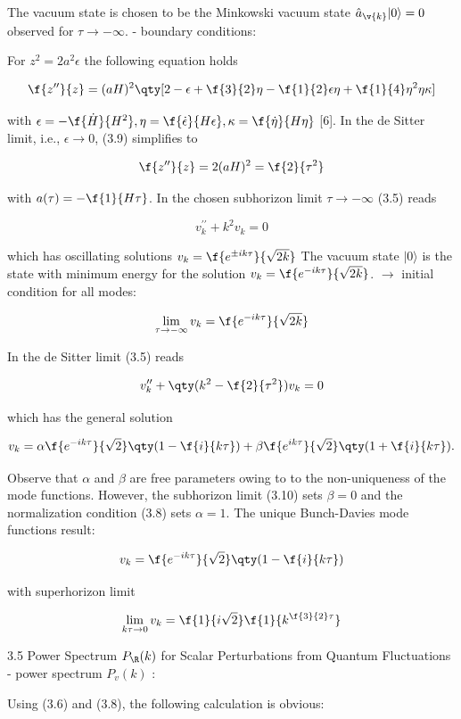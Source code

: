 The vacuum state is chosen to be the Minkowski vacuum state $\hat{a}_{\v{k}}|0\rangle=0$ observed for $\tau \rightarrow-\infty$.
- boundary conditions:

For $z^2=2 a^2 \epsilon$ the following equation holds

\[
\f{z^{\prime \prime}}{z}=(a H)^2\qty[2-\epsilon+\f{3}{2} \eta-\f{1}{2} \epsilon \eta+\f{1}{4} \eta^2 \eta \kappa]
\]

with $\epsilon=-\f{\dot{H}}{H^2}, \eta=\f{\dot{\epsilon}}{H \epsilon}, \kappa=\f{\dot{\eta}}{H \eta}$ [6].
In the de Sitter limit, i.e., $\epsilon \rightarrow 0$, (3.9) simplifies to

\[
\f{z^{\prime \prime}}{z}=2(a H)^2=\f{2}{\tau^2}
\]

with $a(\tau)=-\f{1}{H \tau}$.
In the chosen subhorizon limit $\tau \rightarrow-\infty$ (3.5) reads

\[
v_k^{\prime \prime}+k^2 v_k=0
\]

which has oscillating solutions $v_k=\f{e^{ \pm i k \tau}}{\sqrt{2 k}}$ The vacuum state $|0\rangle$ is the state with minimum energy for the solution $v_k=\f{e^{-i k \tau}}{\sqrt{2 k}}$.
$\rightarrow$ initial condition for all modes:

\[
\lim _{\tau \rightarrow-\infty} v_k=\f{e^{-i k \tau}}{\sqrt{2 k}}
\]


In the de Sitter limit (3.5) reads

\[
v_k^{\prime \prime}+\qty(k^2-\f{2}{\tau^2}) v_k=0
\]

which has the general solution

\[
v_k=\alpha \f{e^{-i k \tau}}{\sqrt{2}}\qty(1-\f{i}{k \tau})+\beta \f{e^{i k \tau}}{\sqrt{2}}\qty(1+\f{i}{k \tau}) .
\]


Observe that $\alpha$ and $\beta$ are free parameters owing to to the non-uniqueness of the mode functions. However, the subhorizon limit (3.10) sets $\beta=0$ and the normalization condition (3.8) sets $\alpha=1$. The unique Bunch-Davies mode functions result:

\[
v_k=\f{e^{-i k \tau}}{\sqrt{2}}\qty(1-\f{i}{k \tau})
\]

with superhorizon limit

\[
\lim _{k \tau \rightarrow 0} v_k=\f{1}{i \sqrt{2}} \f{1}{k^{\f{3}{2} \tau}}
\]

3.5 Power Spectrum $P_{\R }(k)$ for Scalar Perturbations from Quantum Fluctuations
- power spectrum $P_v(k)$ :

Using (3.6) and (3.8), the following calculation is obvious:

